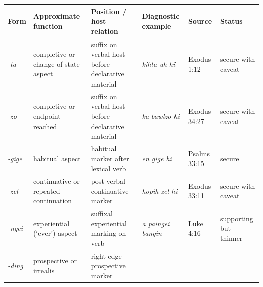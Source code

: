 \documentclass[
  11pt,
  a4paper,
]{article}
\newcounter{none} %
\newcommand{\tdim}[1]{\textit{#1}}
\newcommand{\glossquote}[1]{`#1'}
\begin{document}
{\def\LTcaptype{none} %
\begin{longtable}[]{@{}
  >{\raggedright\arraybackslash}p{}
  >{\raggedright\arraybackslash}p{}
  >{\raggedright\arraybackslash}p{}
  >{\raggedright\arraybackslash}p{}
  >{\raggedright\arraybackslash}p{}
  >{\raggedright\arraybackslash}p{}@{}}
\toprule\noalign{}
\begin{minipage}[b]{\linewidth}\raggedright
Form
\end{minipage} & \begin{minipage}[b]{\linewidth}\raggedright
Approximate function
\end{minipage} & \begin{minipage}[b]{\linewidth}\raggedright
Position / host relation
\end{minipage} & \begin{minipage}[b]{\linewidth}\raggedright
Diagnostic example
\end{minipage} & \begin{minipage}[b]{\linewidth}\raggedright
Source
\end{minipage} & \begin{minipage}[b]{\linewidth}\raggedright
Status
\end{minipage} \\
\midrule\noalign{}
\endhead
\bottomrule\noalign{}
\endlastfoot
\tdim{-ta} & completive or change-of-state aspect & suffix on verbal
host before declarative material & \tdim{kihta uh hi} & Exodus 1:12 &
secure with caveat \\
\tdim{-zo} & completive or endpoint reached & suffix on verbal host
before declarative material & \tdim{ka bawlzo hi} & Exodus 34:27 &
secure with caveat \\
\tdim{-gige} & habitual aspect & habitual marker after lexical verb &
\tdim{en gige hi} & Psalms 33:15 & secure \\
\tdim{-zel} & continuative or repeated continuation & post-verbal
continuative marker & \tdim{hopih zel hi} & Exodus 33:11 & secure with
caveat \\
\tdim{-ngei} & experiential (\glossquote{ever}) aspect & suffixal
experiential marking on verb & \tdim{a paingei bangin} & Luke 4:16 &
supporting but thinner \\
\tdim{-ding} & prospective or irrealis & right-edge prospective marker

\end{longtable}}
\end{document}
